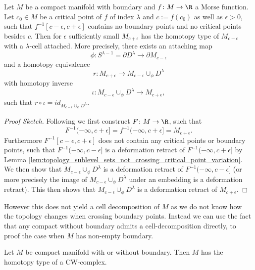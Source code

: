     \begin{theorem}
        \label{thm:topology_when_crossing_critical_point}
        Let $M$ be a compact manifold with boundary and $f \colon M \to \R$ a Morse function. Let $c_0 \in M$ be a critical point of $f$ of index $\lambda$ and $c := f(c_0)$ as well as $\epsilon > 0$, such that $f^{-1}[c-\epsilon,c+\epsilon]$ contains no boundary points and no critical points besides $c$. Then for $\epsilon$ sufficiently small $M_{c+\epsilon}$ has the homotopy type of $M_{c-\epsilon}$ with a $\lambda$-cell attached. More precisely, there exists an attaching map 
        \[
            \phi \colon S^{\lambda - 1} = \partial D^\lambda \to \partial M_{c-\epsilon}
        \] and a homotopy equivalence 
        \[
        r \colon M_{c+\epsilon} \to M_{c-\epsilon} \cup_\phi D^\lambda
        \]
        with homotopy inverse 
        \[
        \iota \colon M_{c-\epsilon} \cup_\phi D^\lambda \to M_{c+\epsilon},
        \]
        such that $r \circ \iota = id_{M_{c-\epsilon} \cup_\phi D^\lambda}$.
    \end{theorem}
    \begin{proof}[Proof Sketch]
        Following \cite{milnor1963morse} we first construct $F \colon M \to \R$, such that 
        $$F^{-1}(-\infty,c+\epsilon] = f^{-1}(-\infty,c+\epsilon] = M_{c+\epsilon}.$$
        Furthermore $F^{-1}[c-\epsilon,c+\epsilon]$ does not contain any critical points or boundary points, such that $F^{-1}(-\infty,c-\epsilon]$ is a deformation retract of $F^{-1}(-\infty,c+\epsilon]$ by Lemma \ref{lem:topology_sublevel_sets_not_crossing_critical_point_variation}. We then show that $M_{c-\epsilon} \cup_\phi D^\lambda$ is a deformation retract of $F^{-1}(-\infty,c-\epsilon]$ (or more precisely the image of $M_{c-\epsilon} \cup_\phi D^\lambda$ under an embedding is a deformation retract). This then shows that $M_{c-\epsilon} \cup_\phi D^\lambda$ is a deformation retract of $M_{c+\epsilon}$.
    \end{proof}
    
    However this does not yield a cell decomposition of $M$ as we do not know how the topology changes when crossing boundary points. Instead we can use the fact that any compact without boundary admits a cell-decomposition directly, to proof the case when $M$ has non-empty boundary.

    \begin{theorem}
        \label{thm:cell_decomp}
        Let $M$ be compact manifold with or without boundary. Then $M$ has the homotopy type of a CW-complex.
    \end{theorem}

